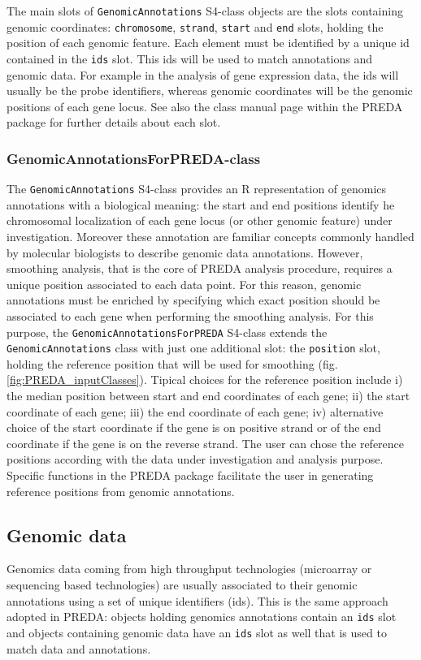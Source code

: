 \documentclass[a4paper,10pt]{article}
\begin{document}
The main slots of \texttt{GenomicAnnotations} S4-class objects are the slots containing genomic coordinates: \texttt{chromosome}, \texttt{strand}, \texttt{start} and \texttt{end} slots, holding the position of each genomic feature. Each element must be identified by a unique id contained in the \texttt{ids} slot. This ids will be used to match annotations and genomic data. For example in the analysis of gene expression data, the ids will usually be the probe identifiers, whereas genomic coordinates will be the genomic positions of each gene locus. See also the class manual page within the PREDA package for further details about each slot.


\subsubsection{GenomicAnnotationsForPREDA-class}

The \texttt{GenomicAnnotations} S4-class provides an R representation of genomics annotations with a biological meaning: the start and end positions identify he chromosomal localization of each gene locus (or other genomic feature) under investigation. Moreover these annotation are familiar concepts commonly handled by molecular biologists to describe genomic data annotations.
However, smoothing analysis, that is the core of PREDA analysis procedure, requires a unique position associated to each data point. For this reason, genomic annotations must be enriched by specifying which exact position should be associated to each gene when performing the smoothing analysis. For this purpose, the \texttt{GenomicAnnotationsForPREDA} S4-class extends the \texttt{GenomicAnnotations} class with just one additional slot: the \texttt{position} slot, holding the reference position that will be used for smoothing (fig. \ref{fig:PREDA_inputClasses}). Tipical choices for the reference position include i) the median position between start and end coordinates of each gene; ii) the start coordinate of each gene; iii) the end coordinate of each gene; iv) alternative choice of the start coordinate if the gene is on positive strand or of the end coordinate if the gene is on the reverse strand. The user can chose the reference positions according with the data under investigation and analysis purpose. Specific functions in the PREDA package facilitate the user in generating reference positions from genomic annotations.


\subsection{Genomic data}
Genomics data coming from high throughput technologies (microarray or sequencing based technologies) are usually associated to their genomic annotations using a set of unique identifiers (ids). This is the same approach adopted in PREDA: objects holding genomics annotations contain an \texttt{ids} slot and objects containing genomic data have an \texttt{ids} slot as well that is used to match data and annotations.
\end{document}
